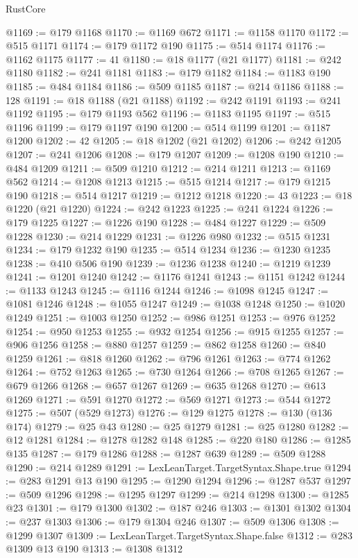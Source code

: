 \begin{lexlean}{RustCore}
\begin{coremodule}
@1169 := @179 @1168
@1170 := @1169 @672
@1171 := @1158 @1170
@1172 := @515 @1171
@1174 := @179 @1172 @190
@1175 := @514 @1174
@1176 := @1162 @1175
@1177 := 41
@1180 := @18 @1177 (@21 @1177)
@1181 := @242 @1180
@1182 := @241 @1181
@1183 := @179 @1182
@1184 := @1183 @190
@1185 := @484 @1184
@1186 := @509 @1185
@1187 := @214 @1186
@1188 := 128
@1191 := @18 @1188 (@21 @1188)
@1192 := @242 @1191
@1193 := @241 @1192
@1195 := @179 @1193 @562
@1196 := @1183 @1195
@1197 := @515 @1196
@1199 := @179 @1197 @190
@1200 := @514 @1199
@1201 := @1187 @1200
@1202 := 42
@1205 := @18 @1202 (@21 @1202)
@1206 := @242 @1205
@1207 := @241 @1206
@1208 := @179 @1207
@1209 := @1208 @190
@1210 := @484 @1209
@1211 := @509 @1210
@1212 := @214 @1211
@1213 := @1169 @562
@1214 := @1208 @1213
@1215 := @515 @1214
@1217 := @179 @1215 @190
@1218 := @514 @1217
@1219 := @1212 @1218
@1220 := 43
@1223 := @18 @1220 (@21 @1220)
@1224 := @242 @1223
@1225 := @241 @1224
@1226 := @179 @1225
@1227 := @1226 @190
@1228 := @484 @1227
@1229 := @509 @1228
@1230 := @214 @1229
@1231 := @1226 @980
@1232 := @515 @1231
@1234 := @179 @1232 @190
@1235 := @514 @1234
@1236 := @1230 @1235
@1238 := @410 @506 @190
@1239 := @1236 @1238
@1240 := @1219 @1239
@1241 := @1201 @1240
@1242 := @1176 @1241
@1243 := @1151 @1242
@1244 := @1133 @1243
@1245 := @1116 @1244
@1246 := @1098 @1245
@1247 := @1081 @1246
@1248 := @1055 @1247
@1249 := @1038 @1248
@1250 := @1020 @1249
@1251 := @1003 @1250
@1252 := @986 @1251
@1253 := @976 @1252
@1254 := @950 @1253
@1255 := @932 @1254
@1256 := @915 @1255
@1257 := @906 @1256
@1258 := @880 @1257
@1259 := @862 @1258
@1260 := @840 @1259
@1261 := @818 @1260
@1262 := @796 @1261
@1263 := @774 @1262
@1264 := @752 @1263
@1265 := @730 @1264
@1266 := @708 @1265
@1267 := @679 @1266
@1268 := @657 @1267
@1269 := @635 @1268
@1270 := @613 @1269
@1271 := @591 @1270
@1272 := @569 @1271
@1273 := @544 @1272
@1275 := @507 (@529 @1273)
@1276 := @129 @1275
@1278 := @130 (@136 @174)
@1279 := @25 @43
@1280 := @25 @1279
@1281 := @25 @1280
@1282 := @12 @1281
@1284 := @1278 @1282 @148
@1285 := @220 @180
@1286 := @1285 @135
@1287 := @179 @1286
@1288 := @1287 @639
@1289 := @509 @1288
@1290 := @214 @1289
@1291 := LexLeanTarget.TargetSyntax.Shape.true
@1294 := @283 @1291 @13 @190
@1295 := @1290 @1294
@1296 := @1287 @537
@1297 := @509 @1296
@1298 := @1295 @1297
@1299 := @214 @1298
@1300 := @1285 @23
@1301 := @179 @1300
@1302 := @187 @246
@1303 := @1301 @1302
@1304 := @237 @1303
@1306 := @179 @1304 @246
@1307 := @509 @1306
@1308 := @1299 @1307
@1309 := LexLeanTarget.TargetSyntax.Shape.false
@1312 := @283 @1309 @13 @190
@1313 := @1308 @1312

\end{coremodule}
\end{lexlean}
